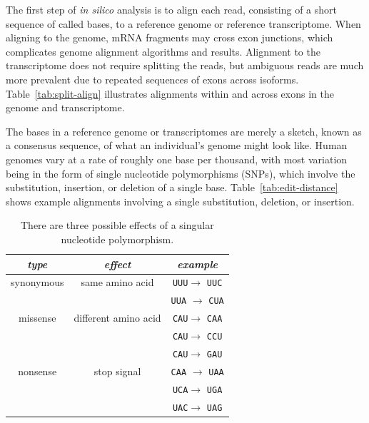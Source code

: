 \documentclass[11pt]{report}
\newcommand{\mybase}[1]{\texttt{#1}\xspace}
\newcommand{\baseA}{\mybase{A}}
\newcommand{\baseC}{\mybase{C}}
\newcommand{\baseG}{\mybase{G}}
\newcommand{\baseU}{\mybase{U}}
\newcommand{\mycaption}[2]{\caption{#2}\label{#1}}
\begin{document}
The first step of \textit{in silico} analysis is to align each read,
consisting of a short sequence of called bases, to a reference genome
or reference transcriptome. When aligning to the genome, mRNA
fragments may cross exon junctions, which complicates genome alignment
algorithms and results. Alignment to the transcriptome does not
require splitting the reads, but ambiguous reads are much more
prevalent due to repeated sequences of exons across isoforms.
Table~\ref{tab:split-align} illustrates alignments within and across
exons in the genome and transcriptome.

The bases in a reference genome or transcriptomes are merely a sketch,
known as a consensus sequence, of what an individual's genome might
look like. Human genomes vary at a rate of roughly one base per
thousand, with most variation being in the form of single nucleotide
polymorphisms (SNPs), which involve the substitution, insertion, or
deletion of a single base. Table~\ref{tab:edit-distance} shows example
alignments involving a single substitution, deletion, or insertion.

\begin{table}[t!]
  \centering
  \begin{tabular}{c|c|c}
    \textit{type} & \textit{effect} & \textit{example}
    \\ \hline
    synonymous & same amino acid & \baseU{}\baseU{}\baseU $\rightarrow$ \baseU{}\baseU{}\baseC
    \\
                  & & \baseU{}\baseU{}\baseA{} $\rightarrow$ \baseC{}\baseU{}\baseA
    \\ \hline
    missense & different amino acid & \baseC{}\baseA{}\baseU $\rightarrow$ \baseC{}\baseA{}\baseA
    \\
                  & & \baseC{}\baseA{}\baseU $\rightarrow$ \baseC{}\baseC{}\baseU
    \\
                  & & \baseC{}\baseA{}\baseU $\rightarrow$ \baseG{}\baseA{}\baseU
    \\ \hline
    nonsense & stop signal & \baseC{}\baseA{}\baseA{} $\rightarrow$ \baseU{}\baseA{}\baseA{}
    \\
                  & & \baseU{}\baseC{}\baseA $\rightarrow$ \baseU{}\baseG{}\baseA
    \\
                  & & \baseU{}\baseA{}\baseC $\rightarrow$ \baseU{}\baseA{}\baseG
  \end{tabular}
  \mycaption{tab:snp-types}{There are three possible effects of a singular nucleotide polymorphism.}
\end{table}
\end{document}
